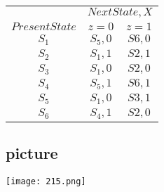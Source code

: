 \documentclass{article}
\begin{document}
\vspace*{0.5cm}
\begin{center}
\begin{tabular}{ccc}
 \hline

 \hline

 \hline

 \hline
 & \multicolumn{2}{c}{$Next State,X$}\\
 \cline{2-3}
 $Present State$ &  $z=0$ & $z=1$\\
\hline
$S_1$    &  $S_5, 0$   &  $S6, 0$ \\
$S_2$    &  $S_1, 1$   &  $S2, 1$ \\
$S_3$    &  $S_1, 0$   &  $S2, 0$ \\
$S_4$    &  $S_5, 1$   &  $S6, 1$ \\
$S_5$    &  $S_1, 0$   &  $S3, 1$ \\
$S_6$    &  $S_4, 1$   &  $S2, 0$ \\
 \hline

 \hline

 \hline

 \hline
\end{tabular}
\end{center}

\vspace*{0.4cm}
\begin{center}
\section{picture}
\texttt{[image: 215.png]}
\end{center}
\end{document}

